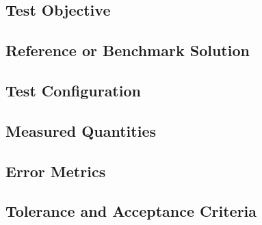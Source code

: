 %

\subsection{Test Objective}
\label{sec:res-ver-uq-test-objective}


\subsection{Reference or Benchmark Solution}
\label{sec:res-ver-uq-reference-benchmark-solution}


\subsection{Test Configuration}
\label{sec:res-ver-uq-test-configuration}


\subsection{Measured Quantities}
\label{sec:res-ver-uq-measured-quantities}


\subsection{Error Metrics}
\label{sec:res-ver-uq-error-metrics}


\subsection{Tolerance and Acceptance Criteria}
\label{sec:res-ver-uq-tolerance-acceptance-criteria}


